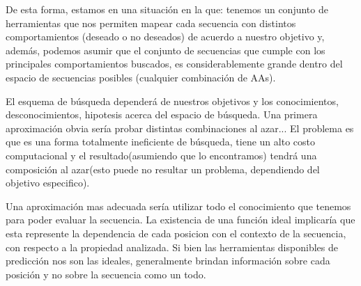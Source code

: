 % 
% 
% 
% 
% 
% 




De esta forma, estamos en una situación en la que: tenemos un conjunto de herramientas que nos permiten mapear cada secuencia con distintos comportamientos (deseado o no deseados) de acuerdo a nuestro objetivo y, además, 
podemos asumir que el conjunto de secuencias que cumple con los principales comportamientos buscados, es considerablemente grande dentro del espacio de secuencias posibles (cualquier combinación de AAs).

El esquema de búsqueda dependerá de nuestros objetivos y los conocimientos, desconocimientos, hipotesis acerca del espacio de búsqueda.
Una primera aproximación obvia sería probar distintas combinaciones al azar...
El problema es que es una forma totalmente ineficiente de búsqueda, tiene un alto costo computacional y el resultado(asumiendo que lo encontramos) tendrá una composición 
al azar(esto puede no resultar un problema, dependiendo del objetivo especifico).

Una aproximación mas adecuada sería utilizar todo el conocimiento que tenemos para poder evaluar la secuencia. 
La existencia de una función ideal implicaría que esta represente la dependencia de cada posicion con el contexto de la secuencia, con respecto a la propiedad analizada.
Si bien las herramientas disponibles de predicción nos son las ideales, generalmente brindan información sobre cada posición y no sobre la secuencia como un todo.

